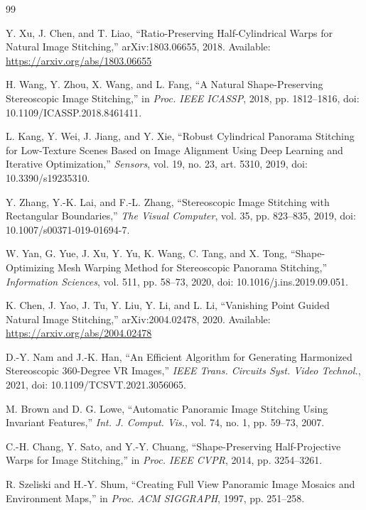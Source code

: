 \documentclass[10pt]{article}
\begin{document}
\begin{thebibliography}{99}
\footnotesize
\setlength{\itemsep}{2pt}

Y. Xu, J. Chen, and T. Liao, ``Ratio-Preserving Half-Cylindrical Warps for Natural Image Stitching,'' arXiv:1803.06655, 2018. Available: \url{https://arxiv.org/abs/1803.06655}

H. Wang, Y. Zhou, X. Wang, and L. Fang, ``A Natural Shape-Preserving Stereoscopic Image Stitching,'' in \emph{Proc. IEEE ICASSP}, 2018, pp. 1812--1816, doi: 10.1109/ICASSP.2018.8461411.

L. Kang, Y. Wei, J. Jiang, and Y. Xie, ``Robust Cylindrical Panorama Stitching for Low-Texture Scenes Based on Image Alignment Using Deep Learning and Iterative Optimization,'' \emph{Sensors}, vol. 19, no. 23, art. 5310, 2019, doi: 10.3390/s19235310.

Y. Zhang, Y.-K. Lai, and F.-L. Zhang, ``Stereoscopic Image Stitching with Rectangular Boundaries,'' \emph{The Visual Computer}, vol. 35, pp. 823--835, 2019, doi: 10.1007/s00371-019-01694-7.

W. Yan, G. Yue, J. Xu, Y. Yu, K. Wang, C. Tang, and X. Tong, ``Shape-Optimizing Mesh Warping Method for Stereoscopic Panorama Stitching,'' \emph{Information Sciences}, vol. 511, pp. 58--73, 2020, doi: 10.1016/j.ins.2019.09.051.

K. Chen, J. Yao, J. Tu, Y. Liu, Y. Li, and L. Li, ``Vanishing Point Guided Natural Image Stitching,'' arXiv:2004.02478, 2020. Available: \url{https://arxiv.org/abs/2004.02478}

D.-Y. Nam and J.-K. Han, ``An Efficient Algorithm for Generating Harmonized Stereoscopic 360-Degree VR Images,'' \emph{IEEE Trans. Circuits Syst. Video Technol.}, 2021, doi: 10.1109/TCSVT.2021.3056065.

M. Brown and D. G. Lowe, ``Automatic Panoramic Image Stitching Using Invariant Features,'' \emph{Int. J. Comput. Vis.}, vol. 74, no. 1, pp. 59--73, 2007.

C.-H. Chang, Y. Sato, and Y.-Y. Chuang, ``Shape-Preserving Half-Projective Warps for Image Stitching,'' in \emph{Proc. IEEE CVPR}, 2014, pp. 3254--3261.

R. Szeliski and H.-Y. Shum, ``Creating Full View Panoramic Image Mosaics and Environment Maps,'' in \emph{Proc. ACM SIGGRAPH}, 1997, pp. 251--258.


\end{thebibliography}
\end{document}
